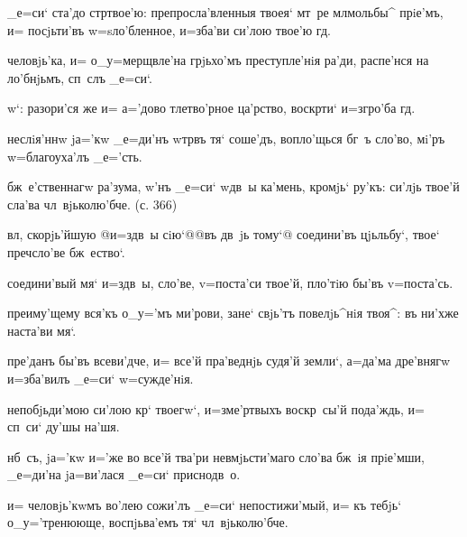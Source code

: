 _е=си` ста'до стр твое'ю: препросла'вленныя твоея` 
мт~ре мл мольбы^ прiе'мъ, и= посjьти'въ 
w=sло'бленное, и=зба'ви си'лою твое'ю гд.


человjь'ка, и= о_у=мерщвле'на грjьхо'мъ преступле'нiя 
ра'ди, распе'нся на ло'бнjьмъ, сп~слъ _е=си`.

w`: разори'ся же и= а='дово тлетво'рное ца'рство, 
воскр ти` и=з\ъ гро'ба гд.

неслiя'ннw jа='кw _е=ди'нъ w\т тр въ тя` соше'дъ, 
вопло'щься бг~ъ сло'во, мi'ръ w=благоуха'лъ _е='сть.


бж~е'ственнагw ра'зума, w'нъ _е=си` w\т дв~ы 
ка'мень, кромjь` ру'къ: си'лjь твое'й сла'ва 
чл~вjьколю'бче. (с. 366)

вл, скорjь'йшую @и=з\ъ дв~ы сiю`@{@въ дв~jь тому`@} 
соедини'въ цjьльбу`, твое` преч сло'ве бж~ество`.

соедини'вый мя` и=з\ъ дв~ы, сло'ве, v=поста'си твое'й, 
пло'тiю бы'въ v=поста'сь.


преиму'щему вся'къ о_у='мъ ми'рови, зане` свjь'тъ 
повелjь^нiя твоя^: въ ни'хже наста'ви мя`.

пре'данъ бы'въ всеви'дче, и= все'й пра'веднjь судя'й 
земли`, а=да'ма дре'внягw и=зба'вилъ _е=си` w=сужде'нiя.

непобjьди'мою си'лою кр` твоегw`, и=з\ъ ме'ртвыхъ 
воскр~сы'й пода'ждь, и= сп~си` ду'шы на'шя.

нб~съ, jа='кw и='же во все'й тва'ри невмjьсти'маго сло'ва 
бж~iя прiе'мши, _е=ди'на jа=ви'лася _е=си` приснодв~о.


и= человjь'кwмъ во'лею сожи'лъ _е=си` непостижи'мый, и= 
къ тебjь` о_у='тренююще, воспjьва'емъ тя` чл~вjьколю'бче.

